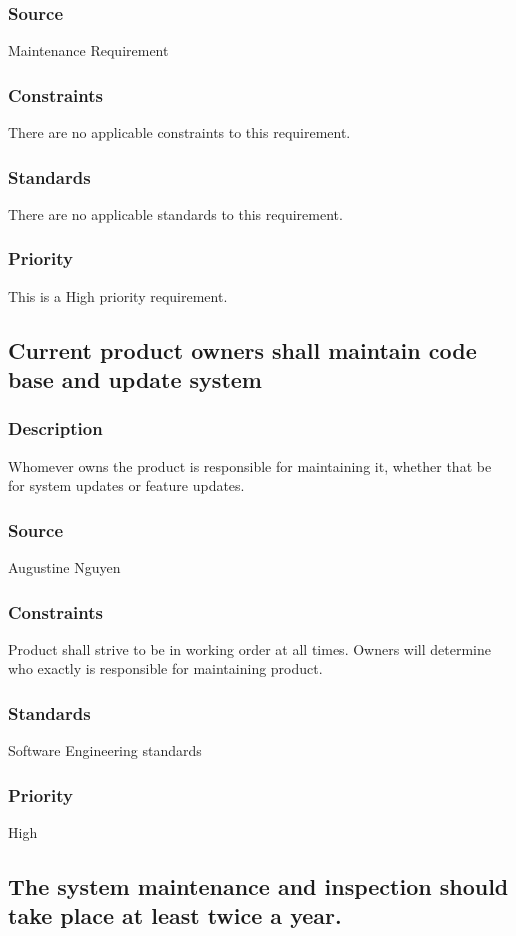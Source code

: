 \subsubsection{Source}
Maintenance Requirement
\subsubsection{Constraints}
There are no applicable constraints to this requirement.
\subsubsection{Standards}
There are no applicable standards to this requirement.
\subsubsection{Priority}
This is a High priority requirement.

\subsection{Current product owners shall maintain code base and update system}
\subsubsection{Description}
Whomever owns the product is responsible for maintaining it, whether that be for system updates or feature updates.
\subsubsection{Source}
Augustine Nguyen
\subsubsection{Constraints}
Product shall strive to be in working order at all times.  Owners will determine who exactly is responsible for maintaining product.
\subsubsection{Standards}
Software Engineering standards
\subsubsection{Priority}
High

\subsection{The system maintenance and inspection should take place at least twice a year.}
